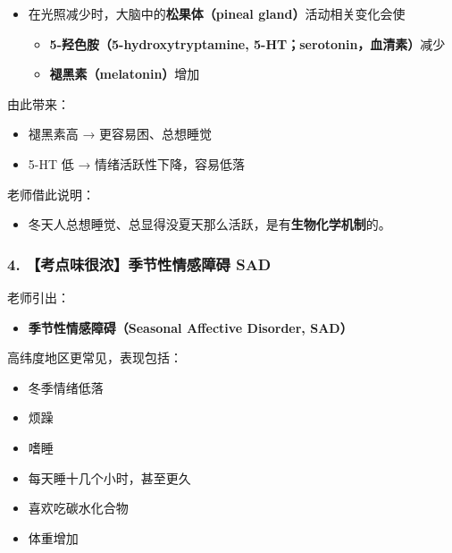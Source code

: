 \documentclass[
  chinese,
  9pt,
  a4paper,
]{ctexart}
\providecommand{\tightlist}{%
  \setlength{\itemsep}{0pt}\setlength{\parskip}{0pt}}
\begin{document}
\begin{itemize}
\item
  在光照减少时，大脑中的\textbf{松果体（pineal gland）}活动相关变化会使

  \begin{itemize}
  \tightlist
  \item
    \textbf{5-羟色胺（5-hydroxytryptamine,
    5-HT；serotonin，血清素）}减少
  \item
    \textbf{褪黑素（melatonin）}增加
  \end{itemize}
\end{itemize}

由此带来：

\begin{itemize}
\tightlist
\item
  褪黑素高 → 更容易困、总想睡觉
\item
  5-HT 低 → 情绪活跃性下降，容易低落
\end{itemize}

老师借此说明：

\begin{itemize}
\tightlist
\item
  冬天人总想睡觉、总显得没夏天那么活跃，是有\textbf{生物化学机制}的。
\end{itemize}

\subsubsection{4. 【考点味很浓】季节性情感障碍
SAD}\label{ux8003ux70b9ux5473ux5f88ux6d53ux5b63ux8282ux6027ux60c5ux611fux969cux788d-sad}

老师引出：

\begin{itemize}
\tightlist
\item
  \textbf{季节性情感障碍（Seasonal Affective Disorder, SAD）}
\end{itemize}

高纬度地区更常见，表现包括：

\begin{itemize}
\tightlist
\item
  冬季情绪低落
\item
  烦躁
\item
  嗜睡
\item
  每天睡十几个小时，甚至更久
\item
  喜欢吃碳水化合物
\item
  体重增加
\end{itemize}
\end{document}

